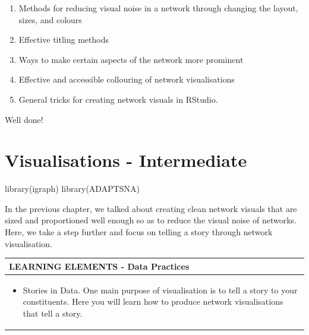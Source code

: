 \documentclass[
  letterpaper,
  DIV=11,
  numbers=noendperiod]{scrreprt}
\newenvironment{Shaded}{\begin{snugshade}}{\end{snugshade}}
\newcommand{\FunctionTok}[1]{\textcolor[rgb]{0.28,0.35,0.67}{#1}}
\newcommand{\NormalTok}[1]{\textcolor[rgb]{0.00,0.23,0.31}{#1}}
\providecommand{\tightlist}{%
  \setlength{\itemsep}{0pt}\setlength{\parskip}{0pt}}\usepackage{longtable,booktabs,array}
\begin{document}
\begin{enumerate}
\def\labelenumi{\arabic{enumi}.}
\tightlist
\item
  Methods for reducing visual noise in a network through changing the
  layout, sizes, and colours
\item
  Effective titling methods
\item
  Ways to make certain aspects of the network more prominent
\item
  Effective and accessible collouring of network visualisations
\item
  General tricks for creating network visuals in RStudio.
\end{enumerate}

Well done!

\chapter{Visualisations -
Intermediate}\label{visualisations---intermediate}

\begin{Shaded}
\begin{Highlighting}[]
\FunctionTok{library}\NormalTok{(igraph)}
\FunctionTok{library}\NormalTok{(ADAPTSNA)}
\end{Highlighting}
\end{Shaded}

In the previous chapter, we talked about creating clean network visuals
that are sized and proportioned well enough so as to reduce the visual
noise of networks. Here, we take a step further and focus on telling a
story through network visualisation.

\begin{longtable}[]{@{}
  >{\raggedright\arraybackslash}p{}@{}}
\toprule\noalign{}
\begin{minipage}[b]{\linewidth}\raggedright
LEARNING ELEMENTS - Data Practices
\end{minipage} \\
\midrule\noalign{}
\endhead
\bottomrule\noalign{}
\endlastfoot
\begin{minipage}[t]{\linewidth}\raggedright
\begin{itemize}
\tightlist
\item
  Stories in Data. One main purpose of visualisation is to tell a story
  to your constituents. Here you will learn how to produce network
  visualisations that tell a story.
\end{itemize}
\end{minipage} \\
\end{longtable}
\end{document}
